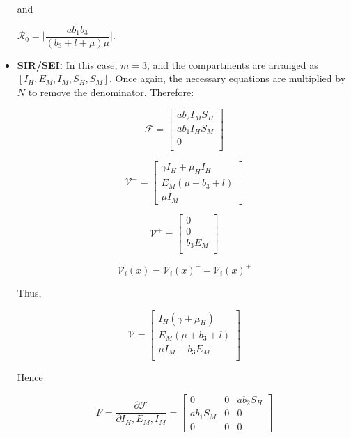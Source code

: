 \documentclass[a4paper,fleqn]{cas-dc}
\begin{document}
\begin{itemize}
and 

$\mathcal{R}_0 = \Big | \dfrac{ab_1b_3}{(b_3+l+\mu)\mu}\Big | $.

\item \textbf{SIR/SEI:}
In this case, $m=3$, and the compartments are arranged as $[I_H, E_M, I_M, S_H, S_M]$. Once again, the necessary equations are multiplied by $N$ to remove the denominator. Therefore:

$$ {\mathcal F} =\begin{bmatrix}
a  b_2  I_M  S_H \\
a b_1 I_H S_M\\
0\\
\end{bmatrix} $$

$$
{\mathcal V^-} = \begin{bmatrix}
\gamma I_H +\mu_H I_H\\
E_M (\mu + b_3 + l)\\
\mu I_M
\end{bmatrix}
$$

$$
{\mathcal V^+} = \begin{bmatrix}
0\\
0\\
b_3 E_M \\
\end{bmatrix}
$$

$${\mathcal V}_i (x) = {\mathcal V}_i(x)^{-} - {\mathcal V}_i(x)^+$$

Thus,

$$
{\mathcal V} =
\begin{bmatrix}
I_H (\gamma + \mu_H) \\
E_M (\mu + b_3 + l)\\
\mu I_M - b_3 E_M\\
\end{bmatrix}
$$

Hence

$$ F = \dfrac{\partial{\mathcal F}}{\partial I_H, E_M, I_M} =
\begin{bmatrix}
0 & 0 & ab_2 S_H\\
ab_1 S_M & 0 & 0\\
0 & 0 & 0
\end{bmatrix}$$


\end{itemize}
\end{document}
